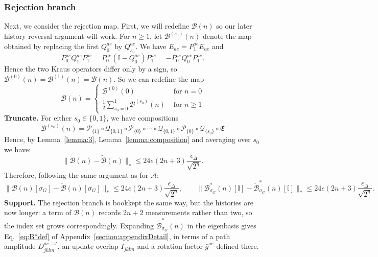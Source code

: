 \documentclass[aps,floatfix,10pt,amssymb,amsfont,amsmath,superscriptaddress,float,nofootinbib,longbibliography,nobalancelastpage,twocolumn]{revtex4-2}
\begin{document}
\begin{widetext}
\subsubsection{Rejection branch}
\label{section:rejectionbranch}
Next, we consider the rejection map.  First, we will redefine $\mathcal{B}(n)$ so our later history reversal argument will work. For $n\geq 1$, let $\mathcal{B}^{(s_0)}(n)$ denote
the map obtained by replacing the first $Q^{ae}_0$ by
$Q^{ae}_{s_0}$. We have $E_{ae}=P^{ae}_1E_{ae}$ and
\begin{equation*}
    P^{ae}_0Q^{ae}_1P^{ae}_1
    =P^{ae}_0(\mathbb I-Q^{ae}_0)P^{ae}_1
    =-P^{ae}_0Q^{ae}_0P^{ae}_1.
\end{equation*}
Hence the two Kraus operators differ only by a sign, so $\mathcal{B}^{(0)}(n)=\mathcal{B}^{(1)}(n)=\mathcal{B}(n)$. So we can redefine the map
\begin{equation*}
    \mathcal{B}(n)=\begin{cases}\mathcal{B}^{(0)}(0)  &  \text{ for } n =0
    \\\frac{1}{2}\sum_{s_0=0}^1 \mathcal{B}^{(s_0)}(n) &  \text{ for }n\geq 1 \end{cases}
\end{equation*}
\textbf{Truncate.} For either $s_0\in\{0,1\}$, we have
compositions
\begin{equation}
    \mathcal{B}^{(s_0)}(n) = \mathcal{P}_{\{1\}}\circ\mathcal{Q}_{\{0,1\}}\circ\mathcal{P}_{\{0\}}\circ\cdots\circ\mathcal{Q}_{\{0,1\}}\circ\mathcal{P}_{\{0\}}\circ\mathcal{Q}_{\{s_0\}}\circ\mathfrak{E}
\end{equation}
Hence, by Lemma~\ref{lemma:3}, Lemma~\ref{lemma:composition} and averaging over $s_0$ we have:
\begin{equation}
    \|\mathcal B(n)-\tilde{\mathcal B}(n)\|_\diamond\leq 24e(2n+3)\frac{\epsilon_{\Delta}}{\sqrt{2^{\eta}}}.
\end{equation}
Therefore, following the same argument as for $\mathcal{A}$:
\begin{equation}
    \|\mathcal{B}(n)[\sigma_G] - \tilde{\mathcal{B}}(n)[\sigma_G]\|_* \leq 24e(2n+3)\frac{\epsilon_{\Delta}}{\sqrt{2^{\eta}}},
    \qquad \|\mathcal{B}^*_{\sigma_G}(n)[\mathbb{I}] - \tilde{\mathcal{B}}^*_{\sigma_G}(n)[\mathbb{I}]\|_* \leq 24e(2n+3)\frac{\epsilon_{\Delta}}{\sqrt{2^{\eta}}}.
    \label{eq:Bsrelation}
\end{equation}
\textbf{Support.} The rejection branch is bookkept the same way, but the histories are now longer: a term of $\mathcal{B}(n)$ records $2n+2$ measurements rather than two, so the index set grows correspondingly. Expanding $\tilde{\mathcal{B}}^*_{\sigma_G}(n)$ in the eigenbasis gives Eq.~\eqref{eq:B*def} of Appendix~\ref{section:appendixDetail}, in terms of a path amplitude $D^{ae,zz'}_{jklm}$, an update overlap $I_{jklm}$ and a rotation factor $\bar g^{ae}$ defined there.


\end{widetext}
\end{document}
